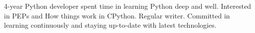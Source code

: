 
4-year Python developer spent time in learning Python deep and well. Interested in PEPs and How things work in CPython. Regular writer. Committed in learning continuously and staying up-to-date with latest technologies.